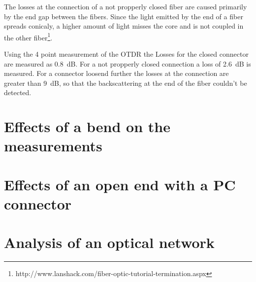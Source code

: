 The losses at the connection of a not propperly closed fiber are caused primarily by the end gap between the fibers. Since the light emitted by the end of a fiber spreads conicaly, a higher amount of light misses the core and is not coupled in the other fiber\footnote[4]{http://www.lanshack.com/fiber-optic-tutorial-termination.aspx}.

Using the 4 point measurement of the OTDR the Losses for the closed connector are measured as 0.8~dB. For a not propperly closed connection a loss of 2.6~dB is measured. For a connector loosend further the losses at the connection are greater than 9~dB, so that the backscattering at the end of the fiber couldn't be detected.

\section{Effects of a bend on the measurements}



\section{Effects of an open end with a PC connector}

\section{Analysis of an optical network}



